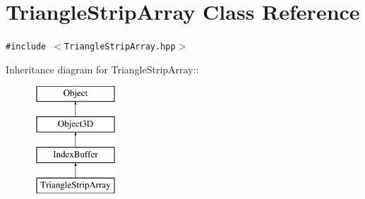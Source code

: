 \hypertarget{classm3g_1_1TriangleStripArray}{
\section{TriangleStripArray Class Reference}
\label{classm3g_1_1TriangleStripArray}
}
{\tt \#include $<$TriangleStripArray.hpp$>$}

Inheritance diagram for TriangleStripArray::\begin{figure}[H]
\begin{center}
\leavevmode
\includegraphics[height=4cm]{classm3g_1_1TriangleStripArray}
\end{center}
\end{figure}
